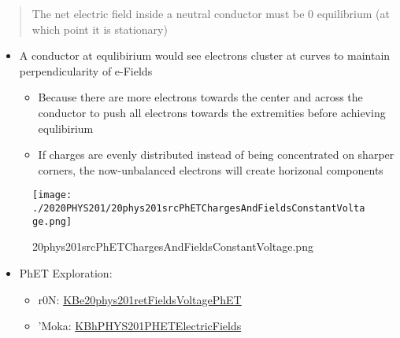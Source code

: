 \documentclass[letterpaper]{article}
\begin{document}
\begin{quote}
The net electric field inside a neutral conductor must be 0
equilibrium (at which point it is stationary)
\end{quote}

\begin{itemize}
\item A conductor at equlibirium would see electrons cluster at curves to
maintain perpendicularity of e-Fields

\begin{itemize}
\item Because there are more electrons towards the center and across the
conductor to push all electrons towards the extremities before
achieving equlibirium
\item If charges are evenly distributed instead of being concentrated on
sharper corners, the now-unbalanced electrons will create horizonal
components
\end{itemize}
\end{itemize}

\begin{figure}[htbp]
\centering
\texttt{[image: ./2020PHYS201/20phys201srcPhETChargesAndFieldsConstantVoltage.png]}
\caption{20phys201srcPhETChargesAndFieldsConstantVoltage.png}
\end{figure}

\begin{itemize}
\item PhET Exploration:

\begin{itemize}
\item r0N:
\href{KBe20phys201retFieldsVoltagePhET.org}{KBe20phys201retFieldsVoltagePhET}
\item 'Moka:
\href{KBhPHYS201PHETElectricFields.org}{KBhPHYS201PHETElectricFields}
\end{itemize}
\end{itemize}
\end{document}
